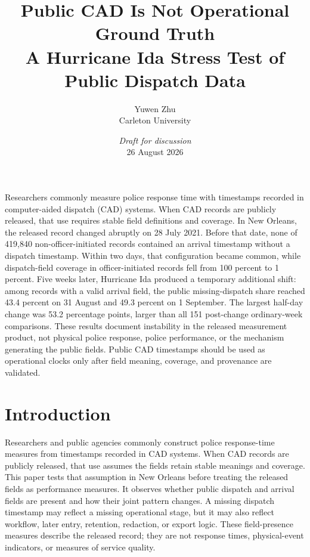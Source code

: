 \documentclass[11pt]{article}
\title{\vspace{-1.7em}\textbf{Public CAD Is Not Operational Ground Truth}\\[0.35em]
\large A Hurricane Ida Stress Test of Public Dispatch Data}
\author{Yuwen Zhu\\Carleton University}
\date{\textit{Draft for discussion}\\[0.2em]26 August 2026}
\begin{document}
\maketitle
\thispagestyle{plain}
\vspace{-1.3em}

\begin{plainbox}[title=Abstract]
Researchers commonly measure police response time with timestamps recorded in computer-aided dispatch (CAD) systems. When CAD records are publicly released, that use requires stable field definitions and coverage. In New Orleans, the released record changed abruptly on 28 July 2021. Before that date, none of 419,840 non-officer-initiated records contained an arrival timestamp without a dispatch timestamp. Within two days, that configuration became common, while dispatch-field coverage in officer-initiated records fell from 100 percent to 1 percent. Five weeks later, Hurricane Ida produced a temporary additional shift: among records with a valid arrival field, the public missing-dispatch share reached 43.4 percent on 31 August and 49.3 percent on 1 September. The largest half-day change was 53.2 percentage points, larger than all 151 post-change ordinary-week comparisons. These results document instability in the released measurement product, not physical police response, police performance, or the mechanism generating the public fields. Public CAD timestamps should be used as operational clocks only after field meaning, coverage, and provenance are validated.
\end{plainbox}


\section{Introduction}

Researchers and public agencies commonly construct police response-time measures from timestamps recorded in CAD systems. When CAD records are publicly released, that use assumes the fields retain stable meanings and coverage. This paper tests that assumption in New Orleans before treating the released fields as performance measures. It observes whether public dispatch and arrival fields are present and how their joint pattern changes. A missing dispatch timestamp may reflect a missing operational stage, but it may also reflect workflow, later entry, retention, redaction, or export logic. These field-presence measures describe the released record; they are not response times, physical-event indicators, or measures of service quality.
\end{document}
